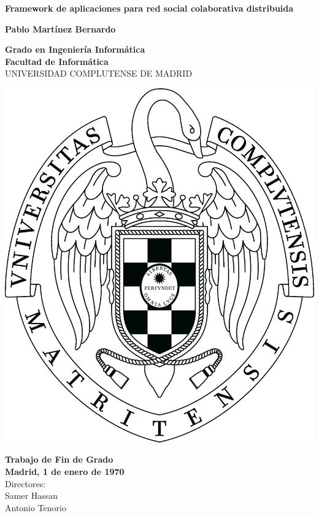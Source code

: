 \setcounter{page}{1}

\newpage
\thispagestyle{cover}
\begin{center}
  {\Huge \bf Framework de aplicaciones para red social colaborativa distribuida}

  \vfill
  {\LARGE\bf Pablo Martínez Bernardo}

  \vfill

  {\Large\bf Grado en Ingeniería Informática\\}
  {\Large\bf Facultad de Informática\\}
  \vspace*{0.4cm}
  {UNIVERSIDAD COMPLUTENSE DE MADRID}
  \vspace*{0.8cm}
  
   \begin{center}
   \includegraphics[keepaspectratio, scale=0.12]{Media/ucmlogo.png}
   \end{center}
  
  \vspace*{0.5cm}

  {\large\bf Trabajo de Fin de Grado\\
             Madrid, 1 de enero de 1970\\}
  \vspace*{0.7cm}
  {\large Directores:\\
          Samer Hassan\\
          Antonio Tenorio}
  \vfill

  \rhead{}
  \rfoot{}
  \fancyhf{}

\end{center}

